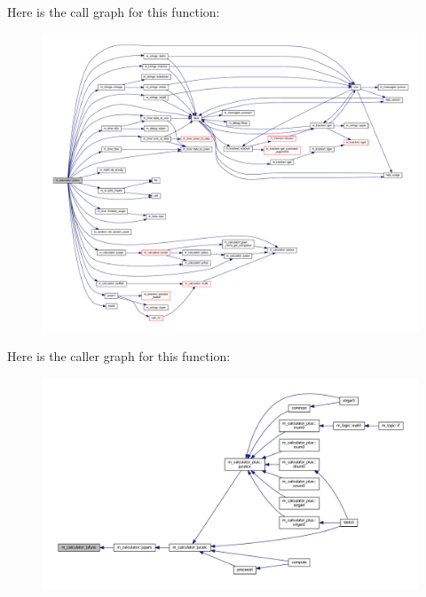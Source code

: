 Here is the call graph for this function\+:
\nopagebreak
\begin{figure}[H]
\begin{center}
\leavevmode
\includegraphics[width=350pt]{namespacem__calculator_ab9afbbbd87dd1434f72853350afec2a6_cgraph}
\end{center}
\end{figure}
Here is the caller graph for this function\+:
\nopagebreak
\begin{figure}[H]
\begin{center}
\leavevmode
\includegraphics[width=350pt]{namespacem__calculator_ab9afbbbd87dd1434f72853350afec2a6_icgraph}
\end{center}
\end{figure}
\mbox{\label{namespacem__calculator_a183990dad923a0e1338b0df538c3fec8}} 
